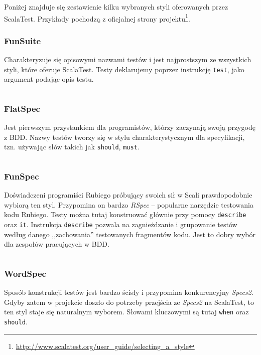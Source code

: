 \documentclass[wimgr]{xmgr}
\begin{document}
Poniżej znajduje się zestawienie kilku wybranych styli oferowanych przez ScalaTest. Przykłady pochodzą z oficjalnej strony projektu\footnote{\url{http://www.scalatest.org/user_guide/selecting_a_style}}.

\subsubsection{FunSuite}

Charakteryzuje się opisowymi nazwami testów i jest najprostszym ze wszystkich styli, które oferuje ScalaTest. Testy deklarujemy poprzez instrukcję \texttt{test}, jako argument podając opis testu.

\inputminted[fontsize=\small]{scala}{code/FunSuite.scala}
 
\subsubsection{FlatSpec}

Jest pierwszym przystankiem dla programistów, którzy zaczynają swoją przygodę z BDD. Nazwy testów tworzy się w stylu charakterystycznym dla specyfikacji, tzn. używając słów takich jak \texttt{should}, \texttt{must}.

\inputminted[fontsize=\small]{scala}{code/FlatSpec.scala}

\subsubsection{FunSpec}

Doświadczeni programiści Rubiego próbujący swoich sił w Scali prawdopodobnie wybiorą ten styl. Przypomina on bardzo \emph{RSpec} -- popularne narzędzie testowania kodu Rubiego. Testy można tutaj konstruować głównie przy pomocy \texttt{describe} oraz \texttt{it}. Instrukcja \texttt{describe} pozwala na zagnieżdzanie i grupowanie testów według danego ,,zachowania'' testowanych fragmentów kodu. Jest to dobry wybór dla zespołów pracujących w BDD.

\inputminted[fontsize=\small]{scala}{code/FunSpec.scala}

\subsubsection{WordSpec}

Sposób konstrukcji testów jest bardzo ścisły i przypomina konkurencyjny \emph{Specs2}. Gdyby zatem w projekcie doszło do potrzeby przejścia ze \emph{Specs2} na ScalaTest, to ten styl staje się naturalnym wyborem. Słowami kluczowymi są tutaj \texttt{when} oraz \texttt{should}.
\end{document}
